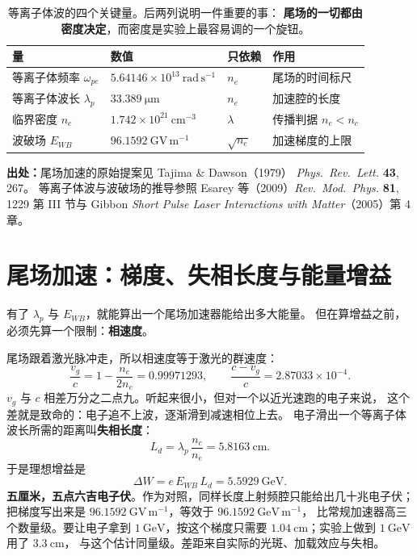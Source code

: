 \begin{table}[htbp]
\centering
\small
\caption{等离子体波的四个关键量。后两列说明一件重要的事：
\textbf{尾场的一切都由密度决定}，而密度是实验上最容易调的一个旋钮。}
\label{tab:app-y-wake}
\begin{tabular}{p{3.2cm}p{3.4cm}p{3.4cm}p{3.3cm}}
\toprule
量 & 数值 & 只依赖 & 作用 \\
\midrule
等离子体频率 $\omega_{pe}$ & $5.64146\times10^{13}\ \mathrm{rad\,s^{-1}}$ & $n_e$ & 尾场的时间标尺 \\
等离子体波长 $\lambda_p$ & $33.389\ \mathrm{\mu m}$ & $n_e$ & 加速腔的长度 \\
临界密度 $n_c$ & $1.742\times10^{21}\ \mathrm{cm^{-3}}$ & $\lambda$ & 传播判据 $n_e<n_c$ \\
波破场 $E_{WB}$ & $96.1592\ \mathrm{GV\,m^{-1}}$ & $\sqrt{n_e}$ & 加速梯度的上限 \\
\bottomrule
\end{tabular}

\end{table}

{\footnotesize
\textbf{出处：}尾场加速的原始提案见 Tajima \& Dawson（1979）
\emph{Phys.\ Rev.\ Lett.} \textbf{43}, 267。
等离子体波与波破场的推导参照
Esarey 等（2009）\emph{Rev.\ Mod.\ Phys.} \textbf{81}, 1229 第 III 节与
Gibbon \emph{Short Pulse Laser Interactions with Matter}（2005）第 4 章。
}

\section{尾场加速：梯度、失相长度与能量增益}
\label{sec:app-y-lwfa}

有了 $\lambda_p$ 与 $E_{WB}$，就能算出一个尾场加速器能给出多大能量。
但在算增益之前，必须先算一个限制：\textbf{相速度}。

尾场跟着激光脉冲走，所以相速度等于激光的群速度：
\begin{equation}
\frac{v_g}{c} = 1 - \frac{n_e}{2n_c} = 0.99971293,
\qquad
\frac{c-v_g}{c} = 2.87033\times10^{-4}.
\label{eq:app-y-vg}
\end{equation}
$v_g$ 与 $c$ 相差万分之二点九。听起来很小，但对一个以近光速跑的电子来说，
这个差就是致命的：电子追不上波，逐渐滑到减速相位上去。
电子滑出一个等离子体波长所需的距离叫\textbf{失相长度}：
\begin{equation}
L_d = \lambda_p\,\frac{n_c}{n_e} = 5.8163\ \mathrm{cm}.
\label{eq:app-y-dephasing}
\end{equation}
于是理想增益是
\begin{equation}
\Delta W = e\,E_{WB}\,L_d = 5.5929\ \mathrm{GeV}.
\label{eq:app-y-gain}
\end{equation}
\textbf{五厘米，五点六吉电子伏}。作为对照，同样长度上射频腔只能给出几十兆电子伏；
把梯度写出来是 $96.1592\ \mathrm{GV\,m^{-1}}$，等效于 $96.1592\ \mathrm{GeV\,m^{-1}}$，
比常规加速器高三个数量级。要让电子拿到 $1\ \mathrm{GeV}$，按这个梯度只需要
$1.04\ \mathrm{cm}$；实验上做到 $1\ \mathrm{GeV}$ 用了 $3.3\ \mathrm{cm}$，
与这个估计同量级。差距来自实际的光斑、加载效应与失相。


